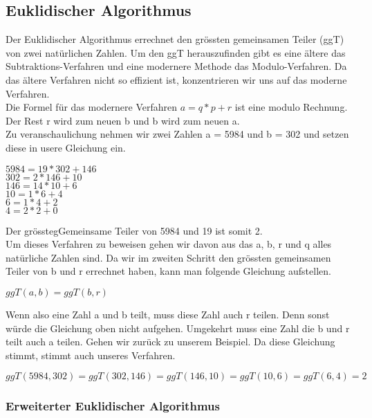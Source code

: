 \subsection{Euklidischer Algorithmus}
Der Euklidischer Algorithmus errechnet den grössten gemeinsamen Teiler (ggT) von zwei natürlichen Zahlen. Um den ggT herauszufinden gibt es eine ältere das Subtraktions-Verfahren und eine modernere Methode das Modulo-Verfahren. Da das ältere Verfahren nicht so effizient ist, konzentrieren wir uns auf das moderne Verfahren.\\
Die Formel für das modernere Verfahren $a = q * p + r$ ist eine modulo Rechnung. Der Rest r wird zum neuen b und b wird zum neuen a. \\
Zu veranschaulichung nehmen wir zwei Zahlen a = 5984 und b = 302 und setzen diese in usere Gleichung ein.
\begin{center}
$ 5984 = 19 * 302 + 146 $\\
$ 302 = 2 * 146 + 10 $\\
$ 146 = 14 * 10 + 6 $ \\
$ 10 = 1 * 6 + 4 $ \\
$ 6 = 1 * 4 + 2 $ \\
$ 4 = 2 * 2 + 0 $\\
\end{center}
Der grösstegGemeinsame Teiler von 5984 und 19 ist somit 2. \\[2ex]
Um dieses Verfahren zu beweisen gehen wir davon aus das a, b, r und q alles natürliche Zahlen sind. Da wir im zweiten Schritt den grössten gemeinsamen Teiler von b und r errechnet haben, kann man folgende Gleichung aufstellen.
\begin{center}
$ ggT(a,b) = ggT(b,r) $\\
\end{center}
Wenn also eine Zahl a und b teilt, muss diese Zahl auch r teilen. Denn sonst würde die Gleichung oben nicht aufgehen. Umgekehrt muss eine Zahl die b und r teilt auch a teilen. Gehen wir zurück zu unserem Beispiel. Da diese Gleichung stimmt, stimmt auch unseres Verfahren.
\begin{center}
$ ggT(5984,302) = ggT(302,146) = ggT(146,10) = ggT(10,6) = ggT(6,4) = 2 $
\end{center}
\subsubsection{Erweiterter Euklidischer Algorithmus}
%



